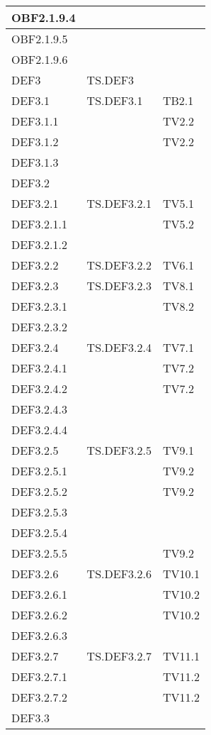 \documentclass{scalatekids-article}
\begin{document}
\begin{longtable}[H]{|l|p{4cm}|p{4cm}|}
  OBF2.1.9.4 & &\\ %
  \hline
  OBF2.1.9.5 & &\\ %
  \hline
  OBF2.1.9.6 & &\\ %
  \hline
  DEF3 & TS.DEF3 & \\
  \hline
  DEF3.1 & TS.DEF3.1 & TB2.1\\
  \hline
  DEF3.1.1 & & TV2.2\\
  \hline
  DEF3.1.2 & & TV2.2\\
  \hline
  DEF3.1.3 & &\\
  \hline
  DEF3.2 & &\\
  \hline
  DEF3.2.1 & TS.DEF3.2.1 & TV5.1 \\
  \hline
  DEF3.2.1.1 & & TV5.2\\
  \hline
  DEF3.2.1.2 & &\\
  \hline
  DEF3.2.2 & TS.DEF3.2.2 & TV6.1\\
  \hline
  DEF3.2.3 & TS.DEF3.2.3 & TV8.1\\
  \hline
  DEF3.2.3.1 & & TV8.2\\
  \hline
  DEF3.2.3.2 & & \\
  \hline
  DEF3.2.4 & TS.DEF3.2.4 & TV7.1\\
  \hline
  DEF3.2.4.1 & & TV7.2\\
  \hline
  DEF3.2.4.2 & & TV7.2\\
  \hline
  DEF3.2.4.3 & & \\
  \hline
  DEF3.2.4.4 & & \\
  \hline
  DEF3.2.5 & TS.DEF3.2.5 & TV9.1\\
  \hline
  DEF3.2.5.1 & & TV9.2\\
  \hline
  DEF3.2.5.2 & & TV9.2\\
  \hline
  DEF3.2.5.3 & & \\
  \hline
  DEF3.2.5.4 & & \\
  \hline
  DEF3.2.5.5 & & TV9.2\\
  \hline
  DEF3.2.6 & TS.DEF3.2.6 & TV10.1\\
  \hline
  DEF3.2.6.1 & & TV10.2\\
  \hline
  DEF3.2.6.2 & & TV10.2\\
  \hline
  DEF3.2.6.3 & & \\
  \hline
  DEF3.2.7 & TS.DEF3.2.7 & TV11.1\\
  \hline
  DEF3.2.7.1 & & TV11.2\\
  \hline
  DEF3.2.7.2 & & TV11.2\\
  \hline
  DEF3.3 & & \\

\end{longtable}
\end{document}
